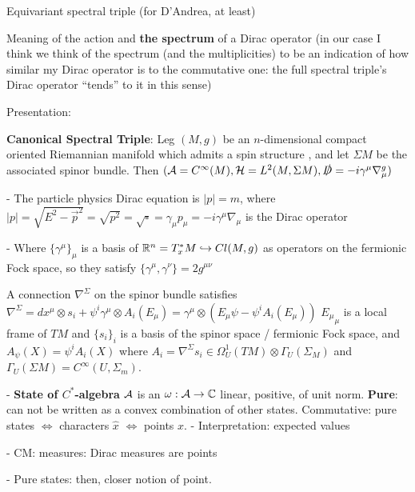  Equivariant spectral triple (for D'Andrea, at least)

Meaning of the action and \textbf{the spectrum} of a Dirac operator (in our case I think we think of the spectrum (and the multiplicities) to be an indication of how similar my Dirac operator is to the commutative one: the full spectral triple's Dirac operator ``tends'' to it in this sense)

Presentation:
    
    \textbf{Canonical Spectral Triple}: Leg $(M, g)$ be an $n$-dimensional compact oriented Riemannian manifold which admits a spin structure%
    , and let $\Sigma M$ %
    be the associated spinor bundle. Then $(\mathcal A = C^\infty(M), \mathcal H = L^2(M, \Sigma M), \slashed D = -i \gamma^\mu \nabla^g_\mu)$%
    
        \quad - The particle physics Dirac equation is $|p| = m$, where $|p| = \sqrt{E^2 - \vec p^2} = \sqrt{p^2} = \sqrt{\square} = \gamma_\mu p_\mu = -i \gamma^\mu \nabla_\mu$ is the Dirac operator
        
        \quad - Where $\{\gamma^\mu\}_\mu$ is a basis of $\mathbb{R}^n = T^*_x M \hookrightarrow Cl(M, g)$ as operators on the fermionic Fock space, so they satisfy $\{\gamma^\mu, \gamma^\nu\} = 2 g^{\mu \nu}$
        
        \quad A connection $\nabla^\Sigma$ on the spinor bundle satisfies $\nabla^\Sigma = dx^\mu \otimes s_i + \psi^i \gamma^\mu \otimes A_i(E_\mu) = \gamma^\mu \otimes (E_\mu \psi - \psi^i A_i(E_\mu))$   ${E_\mu}_\mu$ is a local frame of $T M$ and $\{s_i\}_i$ is a basis of the spinor space / fermionic Fock space, and $A_\psi(X) = \psi^i A_i(X)$ where $A_i = \nabla^\Sigma s_i \in \Omega_U^1(TM) \otimes \Gamma_U(\Sigma_M)$ and $\Gamma_U(\Sigma M) = C^\infty(U, \Sigma_m)$.
    
    - \textbf{State of $C^*$-algebra} $\mathcal A$ is an $\omega : \mathcal A \to \mathbb{C}$ linear, positive, of unit norm. \textbf{Pure}: can not be written as a convex combination of other states. Commutative: pure states $\Longleftrightarrow$ characters $\hat x$ $\Longleftrightarrow$ points $x$.
        \quad - Interpretation: expected values
        
        \quad - CM: measures: Dirac measures are points
        
        \quad - Pure states: then, closer notion of point.
        
